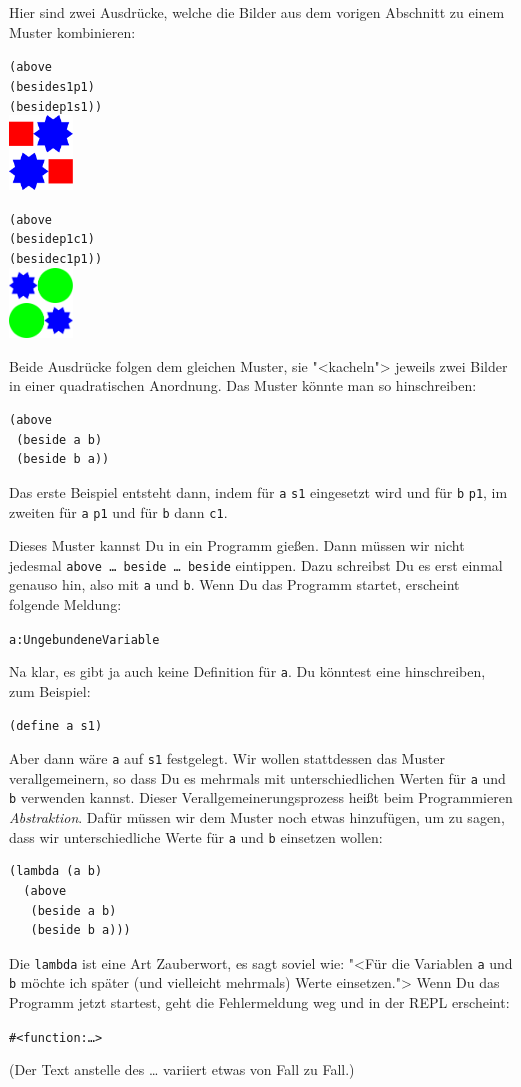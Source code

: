 Hier sind zwei Ausdrücke, welche die Bilder aus dem vorigen Abschnitt
zu einem Muster kombinieren:
%
\begin{alltt}
(above
 (beside s1 p1)
 (beside p1 s1))
\evalsto{} \includegraphics[width=48pt]{i1prog/tile1}

(above
 (beside p1 c1)
 (beside c1 p1))
\evalsto{} \includegraphics[width=48pt]{i1prog/tile2}
\end{alltt}
%
Beide Ausdrücke folgen dem gleichen Muster, sie "<kacheln"> jeweils zwei
Bilder in einer quadratischen Anordnung.  Das Muster könnte man so
hinschreiben:
%
\begin{verbatim}
(above
 (beside a b)
 (beside b a))
\end{verbatim}
%
Das erste Beispiel entsteht dann, indem für \texttt{a} \texttt{s1}
eingesetzt wird und für \texttt{b} \texttt{p1}, im zweiten für \texttt{a}
\texttt{p1} und für \texttt{b} dann \texttt{c1}.

Dieses Muster kannst Du in ein Programm gießen.  Dann müssen wir nicht
jedesmal \texttt{above \ldots{} beside \ldots{} beside} eintippen.
Dazu schreibst Du es erst einmal genauso hin, also mit \texttt{a} und
\texttt{b}.  Wenn Du das Programm startet, erscheint folgende Meldung:
%
\begin{alltt}
\color{red}a: Ungebundene Variable
\end{alltt}
%
Na klar, es gibt ja auch keine Definition für \texttt{a}.  Du könntest
eine hinschreiben, zum Beispiel:
%
\begin{verbatim}
(define a s1)
\end{verbatim}
%
Aber dann wäre \texttt{a} auf \texttt{s1} festgelegt.  Wir wollen
stattdessen das Muster verallgemeinern, so dass Du es mehrmals mit
unterschiedlichen Werten für \texttt{a} und \texttt{b} verwenden
kannst.  Dieser Verallgemeinerungsprozess heißt beim Programmieren
\textit{Abstraktion}.  Dafür müssen wir dem Muster
noch etwas hinzufügen, um zu sagen, dass wir unterschiedliche Werte
für \texttt{a} und \texttt{b} einsetzen wollen:
%
\begin{verbatim}
(lambda (a b)
  (above
   (beside a b)
   (beside b a)))
\end{verbatim}
%
Die \texttt{lambda} ist eine Art Zauberwort, es sagt soviel wie: "<Für
die Variablen \texttt{a} und \texttt{b} möchte ich später (und
vielleicht mehrmals) Werte einsetzen.">  Wenn Du das Programm jetzt
startest, geht die Fehlermeldung weg und in der REPL erscheint:
%
\begin{alltt}
#<function:\ldots>
\end{alltt}
%
(Der Text anstelle des \ldots{} variiert etwas von Fall zu Fall.)

